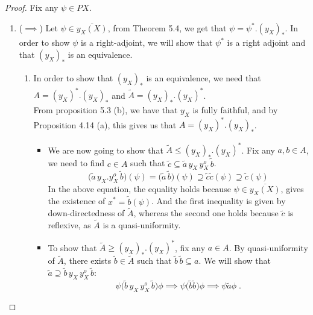 \documentclass[a4paper]{article}
\theoremstyle{definition}
\begin{document}
	\begin{proof}\setcounter{equation}{0}
		Fix any $\psi \in PX$. \setcounter{equation}{0}
		\begin{enumerate}[label=(\roman*)]
			\item ($\implies$)
				Let $\psi \in \overline{y_X(X)}$, from Theorem 5.4, we get that
				$\psi = \psi^*.(y_X^{})_*^{}$. In order to show $\psi$ is a
				right-adjoint, we will show that $\psi^*$ is a
				right adjoint and that $(y_X^{})_*^{}$ is an equivalence.
				\begin{enumerate}[label=\Roman*]
					\item In order to show that $(y_X^{})_*^{}$ is an equivalence,
						we need that $A=(y_X^{})^*_{}.(y_X^{})_*$ and
						$\tilde{A}= (y_X^{})_*.(y_X^{})^*_{}$.\\
						From proposition 5.3 (b), we have that $y_X^{}$
						is fully faithful, and by Proposition 4.14 (a), this gives us
						that $A=(y_X^{})^*_{}.(y_X^{})_*$.
						\begin{itemize}
							\item 	We are now going to show that
								$\tilde{A} \leq (y_X^{})_*.(y_X^{})^*$.
								Fix any $a,b\in A$, we need to find $c\in A$
								such that $\tilde{c} \subseteq \tilde{a}\,
								y_X^{} \, y_X^{o} \, \tilde{b} $.
								\[\big(\tilde{a}\, y_X^{}.y_X^{o}\, \tilde{b}\big) (\psi)
									=\big(\tilde{a}\,\tilde{b}\big) (\psi)
									\supseteq \tilde{c} \tilde{c} (\psi)
								\supseteq \tilde{c}(\psi) \]
								In the above equation, the equality holds because $\psi \in \overline{y_X^{}(X)}$, gives
								the existence of $x^*=\tilde{b}(\psi)$. And the first inequality is given by down-directedness of
								$\tilde{A}$, whereas the second one holds because $\tilde{c}$ is reflexive, as $\tilde{A}$ is a
								quasi-uniformity.
							\item To show that $\tilde{A} \geq (y_X^{})_*.(y_X^{})^*$, fix any $a\in A$. By
								quasi-uniformity of $\tilde{A}$, there exists $\tilde{b}\in \tilde{A}$ such that
								$\tilde{b} \, \tilde{b} \subseteq a$. We will show that $\tilde{a} \supseteq
								\tilde{b}\,y_X^{} \, y_X^{o} \, \tilde{b} $:
								\[ \psi \big(\tilde{b}\,y_X^{} \, y_X^{o} \, \tilde{b} \big) \phi
								\implies \psi \big( \tilde{b} \tilde{b} \big) \phi \implies \psi \tilde{a} \phi \; .\]


						\end{itemize}


\end{enumerate}
\end{enumerate}
\end{proof}
\end{document}
